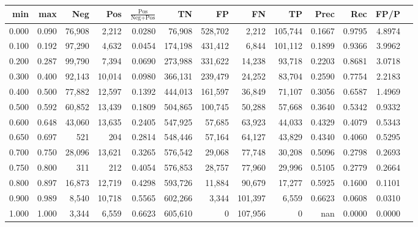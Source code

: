 \begin{tabular}{rrrrrrrrrrrrr}
\toprule
  min &   max &    Neg &    Pos & $\frac{\text{Pos}}{\text{Neg}+\text{Pos}}$ &      TN &      FP &      FN &      TP &   Prec &    Rec &   FP/P \\
\midrule
0.000 & 0.090 & 76,908 &  2,212 &                                     0.0280 &  76,908 & 528,702 &   2,212 & 105,744 & 0.1667 & 0.9795 & 4.8974 \\
0.100 & 0.192 & 97,290 &  4,632 &                                     0.0454 & 174,198 & 431,412 &   6,844 & 101,112 & 0.1899 & 0.9366 & 3.9962 \\
0.200 & 0.287 & 99,790 &  7,394 &                                     0.0690 & 273,988 & 331,622 &  14,238 &  93,718 & 0.2203 & 0.8681 & 3.0718 \\
0.300 & 0.400 & 92,143 & 10,014 &                                     0.0980 & 366,131 & 239,479 &  24,252 &  83,704 & 0.2590 & 0.7754 & 2.2183 \\
0.400 & 0.500 & 77,882 & 12,597 &                                     0.1392 & 444,013 & 161,597 &  36,849 &  71,107 & 0.3056 & 0.6587 & 1.4969 \\
0.500 & 0.592 & 60,852 & 13,439 &                                     0.1809 & 504,865 & 100,745 &  50,288 &  57,668 & 0.3640 & 0.5342 & 0.9332 \\
0.600 & 0.648 & 43,060 & 13,635 &                                     0.2405 & 547,925 &  57,685 &  63,923 &  44,033 & 0.4329 & 0.4079 & 0.5343 \\
0.650 & 0.697 &    521 &    204 &                                     0.2814 & 548,446 &  57,164 &  64,127 &  43,829 & 0.4340 & 0.4060 & 0.5295 \\
0.700 & 0.750 & 28,096 & 13,621 &                                     0.3265 & 576,542 &  29,068 &  77,748 &  30,208 & 0.5096 & 0.2798 & 0.2693 \\
0.750 & 0.800 &    311 &    212 &                                     0.4054 & 576,853 &  28,757 &  77,960 &  29,996 & 0.5105 & 0.2779 & 0.2664 \\
0.800 & 0.897 & 16,873 & 12,719 &                                     0.4298 & 593,726 &  11,884 &  90,679 &  17,277 & 0.5925 & 0.1600 & 0.1101 \\
0.900 & 0.989 &  8,540 & 10,718 &                                     0.5565 & 602,266 &   3,344 & 101,397 &   6,559 & 0.6623 & 0.0608 & 0.0310 \\
1.000 & 1.000 &  3,344 &  6,559 &                                     0.6623 & 605,610 &       0 & 107,956 &       0 &    nan & 0.0000 & 0.0000 \\
\bottomrule
\end{tabular}
